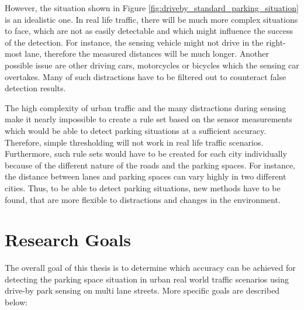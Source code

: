 However, the situation shown in Figure \ref{fig:driveby_standard_parking_situation} is an idealistic one. In real life traffic, there will be much more complex situations to face, which are not as easily detectable and which might influence the success of the detection. For instance, the sensing vehicle might not drive in the right-most lane, therefore the measured distances will be much longer. Another possible issue are other driving cars, motorcycles or bicycles which the sensing car overtakes. Many of such distractions have to be filtered out to counteract false detection results.

The high complexity of urban traffic and the many distractions during sensing make it nearly impossible to create a rule set based on the sensor measurements which would be able to detect parking situations at a sufficient accuracy. Therefore, simple thresholding will not work in real life traffic scenarios. Furthermore, such rule sets would have to be created for each city individually because of the different nature of the roads and the parking spaces. For instance, the distance between lanes and parking spaces can vary highly in two different cities. Thus, to be able to detect parking situations, new methods have to be found, that are more flexible to distractions and changes in the environment.

\section{Research Goals}

The overall goal of this thesis is to determine which accuracy can be achieved for detecting the parking space situation in urban real world traffic scenarios using drive-by park sensing on multi lane streets. More specific goals are described below:


